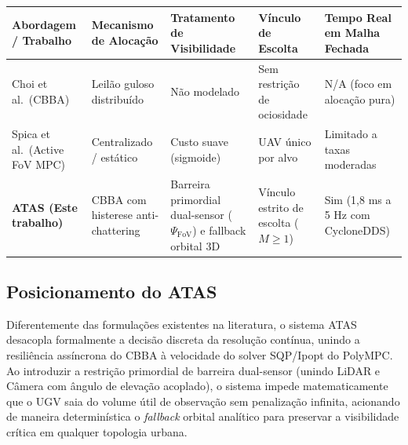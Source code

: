 \documentclass[
  brazilian,
  a4paper]{article}
\newcounter{none} %
\begin{document}
{\def\LTcaptype{none} %
\begin{longtable}[]{@{}
  >{\raggedright\arraybackslash}p{}
  >{\raggedright\arraybackslash}p{}
  >{\raggedright\arraybackslash}p{}
  >{\raggedright\arraybackslash}p{}
  >{\raggedright\arraybackslash}p{}@{}}
\toprule\noalign{}
\begin{minipage}[b]{\linewidth}\raggedright
Abordagem / Trabalho
\end{minipage} & \begin{minipage}[b]{\linewidth}\raggedright
Mecanismo de Alocação
\end{minipage} & \begin{minipage}[b]{\linewidth}\raggedright
Tratamento de Visibilidade
\end{minipage} & \begin{minipage}[b]{\linewidth}\raggedright
Vínculo de Escolta
\end{minipage} & \begin{minipage}[b]{\linewidth}\raggedright
Tempo Real em Malha Fechada
\end{minipage} \\
\midrule\noalign{}
\endhead
\bottomrule\noalign{}
\endlastfoot
Choi et al.~(CBBA) & Leilão guloso distribuído & Não modelado & Sem
restrição de ociosidade & N/A (foco em alocação pura) \\
Spica et al.~(Active FoV MPC) & Centralizado / estático & Custo suave
(sigmoide) & UAV único por alvo & Limitado a taxas moderadas \\
\textbf{ATAS (Este trabalho)} & CBBA com histerese anti-chattering &
Barreira primordial dual-sensor (\(\Psi_{\text{FoV}}\)) e fallback
orbital 3D & Vínculo estrito de escolta (\(M \ge 1\)) & Sim (1,8 ms a 5
Hz com CycloneDDS) \\
\end{longtable}
}

\subsection{Posicionamento do ATAS}\label{posicionamento-do-atas}

Diferentemente das formulações existentes na literatura, o sistema ATAS
desacopla formalmente a decisão discreta da resolução contínua, unindo a
resiliência assíncrona do CBBA à velocidade do solver SQP/Ipopt do
PolyMPC. Ao introduzir a restrição primordial de barreira dual-sensor
(unindo LiDAR e Câmera com ângulo de elevação acoplado), o sistema
impede matematicamente que o UGV saia do volume útil de observação sem
penalização infinita, acionando de maneira determinística o
\emph{fallback} orbital analítico para preservar a visibilidade crítica
em qualquer topologia urbana.
\end{document}
